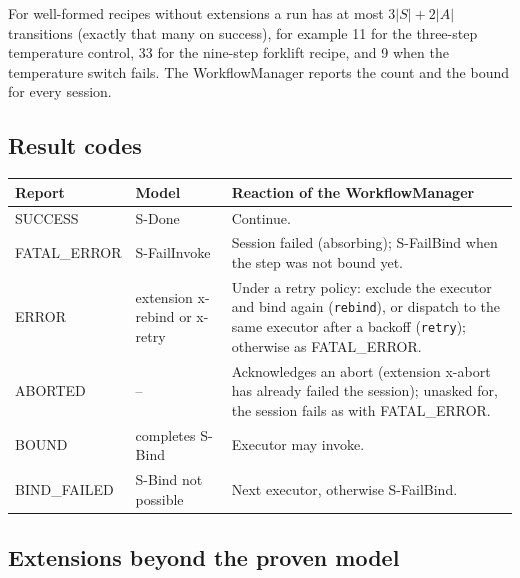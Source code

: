 \documentclass[a4paper]{arrowhead}
\begin{document}
For well-formed recipes without extensions a run has at most $3|S| + 2|A|$ transitions (exactly that many on success),
for example 11 for the three-step temperature control, 33 for the nine-step forklift recipe, and 9 when the
temperature switch fails. The WorkflowManager reports the count and the bound for every session.

\subsection{Result codes}

{\small
\begin{longtable}{|p{2.8cm}|p{3.6cm}|p{9.4cm}|}

\hline
\rowcolor{gray!33} Report & Model & Reaction of the WorkflowManager \\ \hline
\endhead
SUCCESS & S-Done & Continue. \\ \hline
FATAL\_ERROR & S-FailInvoke & Session failed (absorbing); S-FailBind when the step was not bound yet. \\ \hline
ERROR & extension x-rebind or x-retry & Under a retry policy: exclude the executor and bind again (\texttt{rebind}), or dispatch to the same executor after a backoff (\texttt{retry}); otherwise as FATAL\_ERROR. \\ \hline
ABORTED & -- & Acknowledges an abort (extension x-abort has already failed the session); unasked for, the session fails as with FATAL\_ERROR. \\ \hline
BOUND & completes S-Bind & Executor may invoke. \\ \hline
BIND\_FAILED & S-Bind not possible & Next executor, otherwise S-FailBind. \\ \hline
\end{longtable}
}


\subsection{Extensions beyond the proven model}
\end{document}
